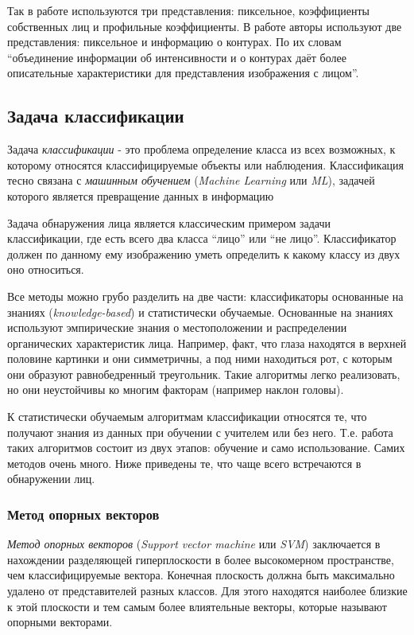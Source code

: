 \documentclass[12pt]{report}
\begin{document}
Так в работе \citep{bojkovic2006face} используются три представления: пиксельное, коэффициенты собственных лиц и 
профильные коэффициенты. В работе \citep{ahmadyfard2008hierarchical} авторы используют две представления: пиксельное и 
информацию о контурах. По их словам ``объединение информации об интенсивности и о контурах даёт более описательные 
характеристики для представления изображения с лицом''.

\subsection{Задача классификации}
\label{classficators}
Задача \emph{классификации} - это проблема определение класса из всех возможных, к которому относятся 
классифицируемые объекты или наблюдения. Классификация тесно связана с \emph{машинным обучением} (\textit{Machine 
Learning} или \textit{ML}), задачей которого является превращение данных в информацию \citep{bradski2008learning}

Задача обнаружения лица является классическим примером задачи классификации, где есть всего два класса ``лицо'' или 
``не лицо''. Классификатор должен по данному ему изображению уметь определить к какому классу из двух оно относиться.

Все методы можно грубо разделить на две части: классификаторы основанные на знаниях (\textit{knowledge-based}) и 
статистически обучаемые. Основанные на знаниях используют эмпирические знания о местоположении и распределении 
органических характеристик лица. \citep{bojkovic2006face} Например, факт, что глаза находятся в верхней половине 
картинки и они симметричны, а под ними находиться рот, с которым они образуют равнобедренный треугольник. Такие 
алгоритмы легко реализовать, но они неустойчивы ко многим факторам (например наклон головы).

К статистически обучаемым алгоритмам классификации относятся те, что получают знания из данных при обучении с 
учителем или без него. Т.е. работа таких алгоритмов состоит из двух этапов: обучение и само использование. Самих 
методов очень много. Ниже приведены те, что чаще всего встречаются в обнаружении лиц. 

\subsubsection{Метод опорных векторов}
\emph{Метод опорных векторов} (\textit{Support vector machine} или \textit{SVM}) заключается в нахождении разделяющей 
гиперплоскости в более высокомерном пространстве, чем классифицируемые вектора. Конечная плоскость должна быть 
максимально удалено от представителей разных классов. Для этого находятся наиболее близкие к этой плоскости и тем 
самым более влиятельные векторы, которые называют опорными векторами. \citep{shavers2006svm}
\end{document}
